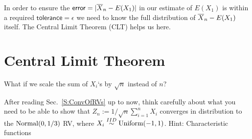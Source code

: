 In order to ensure the $\mathsf{error}=|\overline{X}_n - E(X_1)|$ in our estimate of $E(X_1)$ is within a required $\mathsf{tolerance}=\epsilon$ we need to know the full distribution of $\overline{X}_n - E(X_1)$ itself.  The Central Limit Theorem (CLT) helps us here.


\section{Central Limit Theorem}

What if we scale the sum of $X_i$`s by $\sqrt{n}$ instead of $n$?

\begin{Exercise}[title={What if we scale by $\sqrt{n}$},label={xSumOFUnifminu1To1DividedBySqrtn}]
After reading Sec.~\ref{S:ConvOfRVs} up to now, think carefully about what you need to be able to show that $Z_n := 1/\sqrt{n}\sum_{i=1}^n X_i$ converges in distribution to the $\mbox{{\rm Normal}}(0,1/3)$ RV, where $X_i \overset{IID}{\sim} \mbox{{\rm Uniform}}(-1,1)$. {Hint: Characteristic functions}
\end{Exercise}

